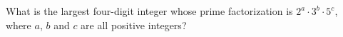 What is the largest four-digit integer whose prime factorization is $2^a\cdot3^b\cdot5^c$, where $a$, $b$ and $c$ are all positive integers?
